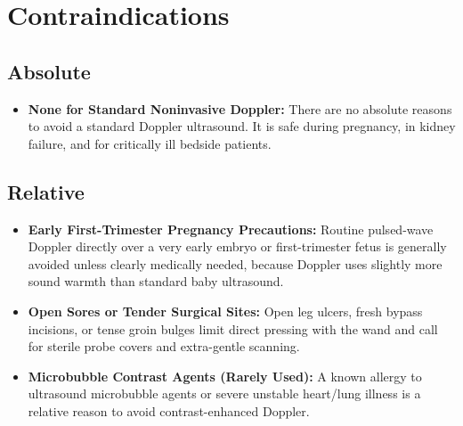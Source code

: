 \section{Contraindications}

\subsection{Absolute}
\begin{itemize}
\item \textbf{None for Standard Noninvasive Doppler:} There are no absolute reasons to avoid a standard Doppler ultrasound. It is safe during pregnancy, in kidney failure, and for critically ill bedside patients.
\end{itemize}

\subsection{Relative}
\begin{itemize}
\item \textbf{Early First-Trimester Pregnancy Precautions:} Routine pulsed-wave Doppler directly over a very early embryo or first-trimester fetus is generally avoided unless clearly medically needed, because Doppler uses slightly more sound warmth than standard baby ultrasound.
\item \textbf{Open Sores or Tender Surgical Sites:} Open leg ulcers, fresh bypass incisions, or tense groin bulges limit direct pressing with the wand and call for sterile probe covers and extra-gentle scanning.
\item \textbf{Microbubble Contrast Agents (Rarely Used):} A known allergy to ultrasound microbubble agents or severe unstable heart/lung illness is a relative reason to avoid contrast-enhanced Doppler.
\end{itemize}

